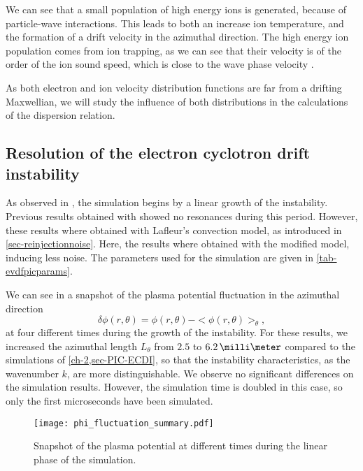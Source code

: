   We can see that a small population of high energy ions is generated, because of particle-wave interactions.
  This leads to both an increase ion temperature, and the formation of a drift velocity in the azimuthal direction.
  The high energy ion population comes from ion trapping, as we can see that their velocity is of the order of the ion sound speed, which is close to the wave phase velocity \citep{lafleur2018}.
  
  \vspace{1em}
  As both electron and ion velocity distribution functions are far from a drifting Maxwellian, we will study the influence of both distributions in the calculations of the dispersion relation.
  
  
  \FloatBarrier
  \subsection{Resolution of the electron cyclotron drift instability} \label{subsec-ECDIPIC}
  
  
    As observed in , the simulation begins by a linear growth of the instability.
    Previous results obtained with \LPPic \citep{croes2017a} showed no resonances during this period.
    However, these results where obtained with Lafleur's convection model, as introduced in \cref{sec-reinjectionnoise}.
    Here, the results where obtained with the modified model, inducing less noise.
    The parameters used for the simulation are given in \cref{tab-evdfpicparams}.
    
    We can see in   a snapshot of the plasma potential fluctuation in the azimuthal direction \[ \delta \phi(r, \theta) = \phi(r, \theta) - < \phi(r, \theta) >_{ \theta}, \]
    at four different times during the growth of the instability.
    For these results, we increased the azimuthal length $L_{\theta}$ from $2.5$ to $6.2\,\milli\meter$ compared to the simulations of \cref{ch-2,sec-PIC-ECDI}, so that the instability characteristics, as the wavenumber $k$, are more distinguishable.
    We observe no significant differences on the simulation results.
    However, the simulation time is doubled in this case, so only the first microseconds have been simulated.
    

    
    \begin{figure}[hbt]
      \centering
      \texttt{[image: phi\_fluctuation\_summary.pdf]}
      \caption{Snapshot of the plasma potential at different times during the linear phase of the simulation.}
      \label{fig-phi_fluctuation_summary}
    \end{figure}
    
